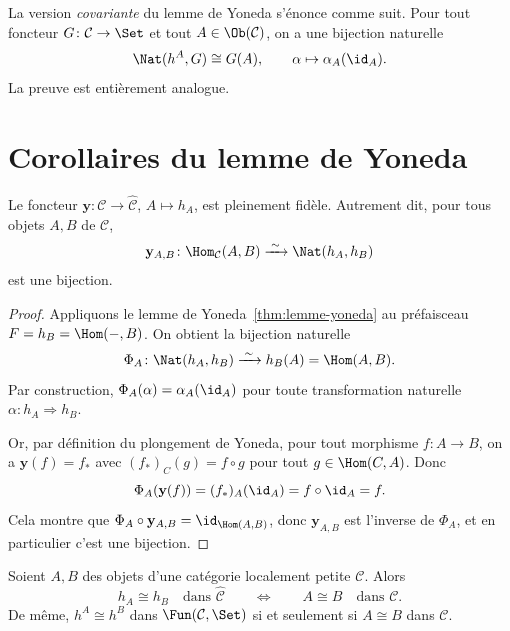 \begin{remarque}\label{rem:yoneda-covariant}
La version \emph{covariante} du lemme de Yoneda s'énonce comme suit.
Pour tout foncteur $G \colon \mathcal{C} \to \Set$ et tout
$A \in \Ob(\mathcal{C})$, on a une bijection naturelle
\[
    \Nat(h^A, G) \cong G(A),
    \qquad \alpha \mapsto \alpha_A(\id_A).
\]
La preuve est entièrement analogue.
\end{remarque}


\section{Corollaires du lemme de Yoneda}\label{sec:yoneda-corollaires}

\begin{corollaire}%
\label{cor:yoneda-pleinement-fidele}
Le foncteur $\mathbf{y} \colon \mathcal{C} \to \widehat{\mathcal{C}}$,
$A \mapsto h_A$, est pleinement fidèle.
Autrement dit, pour tous objets $A, B$ de $\mathcal{C}$,
\[
    \mathbf{y}_{A,B} \colon \Hom_{\mathcal{C}}(A, B)
    \xrightarrow{\;\sim\;} \Nat(h_A, h_B)
\]
est une bijection.
\end{corollaire}

\begin{proof}
Appliquons le lemme de Yoneda~\ref{thm:lemme-yoneda} au préfaisceau
$F = h_B = \Hom(-, B)$. On obtient la bijection naturelle
\[
    \Phi_A \colon \Nat(h_A, h_B) \xrightarrow{\;\sim\;} h_B(A) = \Hom(A, B).
\]
Par construction, $\Phi_A(\alpha) = \alpha_A(\id_A)$ pour toute
transformation naturelle $\alpha \colon h_A \Rightarrow h_B$.

Or, par définition du plongement de Yoneda, pour tout morphisme
$f \colon A \to B$, on a $\mathbf{y}(f) = f_*$ avec
$(f_*)_C(g) = f \circ g$ pour tout $g \in \Hom(C, A)$.
Donc
\[
    \Phi_A(\mathbf{y}(f)) = (f_*)_A(\id_A) = f \circ \id_A = f.
\]
Cela montre que $\Phi_A \circ \mathbf{y}_{A,B} = \id_{\Hom(A,B)}$,
donc $\mathbf{y}_{A,B}$ est l'inverse de $\Phi_A$, et en particulier
c'est une bijection.
\end{proof}

\begin{corollaire}\label{cor:h-iso-implique-iso}
Soient $A, B$ des objets d'une catégorie localement petite $\mathcal{C}$.
Alors
\[
    h_A \cong h_B \quad \text{dans } \widehat{\mathcal{C}}
    \qquad \Longleftrightarrow \qquad
    A \cong B \quad \text{dans } \mathcal{C}.
\]
De même, $h^A \cong h^B$ dans $\Fun(\mathcal{C}, \Set)$
si et seulement si $A \cong B$ dans $\mathcal{C}$.
\end{corollaire}

